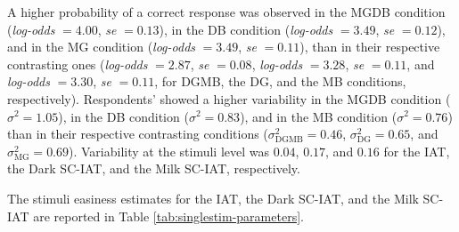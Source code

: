 \documentclass[12pt]{book}
\begin{document}
A higher probability of a correct response was observed in the MGDB condition (\emph{log-odds} $= 4.00$, \emph{se}  $= 0.13$), in the DB condition (\emph{log-odds} $= 3.49$, \emph{se}  $= 0.12$), and in the MG condition (\emph{log-odds} $= 3.49$, \emph{se}  $= 0.11$), than in their respective contrasting ones (\emph{log-odds} $= 2.87$, \emph{se}  $= 0.08$, \emph{log-odds} $=3.28$, \emph{se}  $= 0.11$, and \emph{log-odds} $=3.30$, \emph{se}  $= 0.11$, for DGMB, the DG, and the MB conditions, respectively).
Respondents' showed a higher variability in the MGDB condition ($\sigma^2 = 1.05$), in the  DB condition ($\sigma^2 = 0.83$), and in the MB condition ($\sigma^2 = 0.76$) than in their respective contrasting conditions ($\sigma_{\text{DGMB}}^2 = 0.46$, $\sigma_{\text{DG}}^2 = 0.65$, and $\sigma_{\text{MG}}^2 = 0.69$). 
Variability at the stimuli level was $0.04$, $0.17$, and $0.16$ for the IAT, the Dark SC-IAT, and the Milk SC-IAT, respectively.

The stimuli easiness estimates for the IAT, the Dark SC-IAT, and the Milk SC-IAT are reported in Table \ref{tab:singlestim-parameters}.
\end{document}
